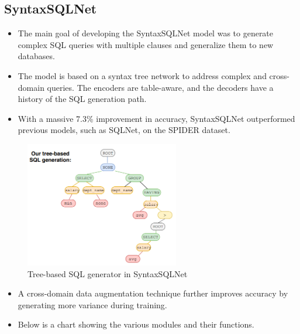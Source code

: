 \subsection*{SyntaxSQLNet}

\begin{itemize}
    \item The main goal of developing the SyntaxSQLNet model was to generate complex SQL queries with multiple clauses and generalize them to new databases.
    \item The model is based on a syntax tree network to address complex and cross-domain queries. The encoders are table-aware, and the decoders have a history of the SQL generation path.
    \item With a massive 7.3\% improvement in accuracy, SyntaxSQLNet outperformed previous models, such as SQLNet, on the SPIDER dataset.
\end{itemize}


\begin{figure}[htb]
    \centering
    \includegraphics[width=0.6\textwidth]{pics/SyntaxSQLNet/Tree-based.png}
    \caption{Tree-based SQL generator in SyntaxSQLNet}
    \label{fig:tree-based}
\end{figure}

\begin{itemize}
    \item A cross-domain data augmentation technique further improves accuracy by generating more variance during training.
    \item Below is a chart showing the various modules and their functions.
\end{itemize}

